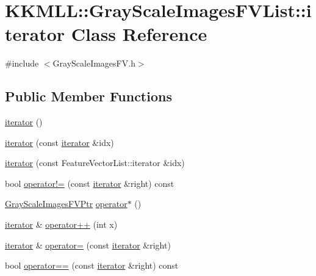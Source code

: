 \hypertarget{class_k_k_m_l_l_1_1_gray_scale_images_f_v_list_1_1iterator}{}\section{K\+K\+M\+LL\+:\+:Gray\+Scale\+Images\+F\+V\+List\+:\+:iterator Class Reference}
\label{class_k_k_m_l_l_1_1_gray_scale_images_f_v_list_1_1iterator}


{\ttfamily \#include $<$Gray\+Scale\+Images\+F\+V.\+h$>$}

\subsection*{Public Member Functions}
\begin{DoxyCompactItemize}
\item 
\hyperlink{class_k_k_m_l_l_1_1_gray_scale_images_f_v_list_1_1iterator_a393c2e6897e1a9809ebfdb9109e57688}{iterator} ()
\item 
\hyperlink{class_k_k_m_l_l_1_1_gray_scale_images_f_v_list_1_1iterator_a1af9cb801447f77b7c36b4d9a1e832b8}{iterator} (const \hyperlink{class_k_k_m_l_l_1_1_gray_scale_images_f_v_list_1_1iterator}{iterator} \&idx)
\item 
\hyperlink{class_k_k_m_l_l_1_1_gray_scale_images_f_v_list_1_1iterator_a5d5ac8c1aae68740d497374bb7aa72de}{iterator} (const Feature\+Vector\+List\+::iterator \&idx)
\item 
bool \hyperlink{class_k_k_m_l_l_1_1_gray_scale_images_f_v_list_1_1iterator_ae37a85e3d12769291e3729334c2548a7}{operator!=} (const \hyperlink{class_k_k_m_l_l_1_1_gray_scale_images_f_v_list_1_1iterator}{iterator} \&right) const 
\item 
\hyperlink{namespace_k_k_m_l_l_ac3f21d259a7b1893920f27296d70bc6e}{Gray\+Scale\+Images\+F\+V\+Ptr} \hyperlink{class_k_k_m_l_l_1_1_gray_scale_images_f_v_list_1_1iterator_af27476d091ea5de61fd47b3c65123f75}{operator$\ast$} ()
\item 
\hyperlink{class_k_k_m_l_l_1_1_gray_scale_images_f_v_list_1_1iterator}{iterator} \& \hyperlink{class_k_k_m_l_l_1_1_gray_scale_images_f_v_list_1_1iterator_af110b91548f283b9a7d8695884cb130e}{operator++} (int x)
\item 
\hyperlink{class_k_k_m_l_l_1_1_gray_scale_images_f_v_list_1_1iterator}{iterator} \& \hyperlink{class_k_k_m_l_l_1_1_gray_scale_images_f_v_list_1_1iterator_ab4aa3928c8c34200349b0e12857f7bb7}{operator=} (const \hyperlink{class_k_k_m_l_l_1_1_gray_scale_images_f_v_list_1_1iterator}{iterator} \&right)
\item 
bool \hyperlink{class_k_k_m_l_l_1_1_gray_scale_images_f_v_list_1_1iterator_ac926dffee0f09d7500d40347099b671b}{operator==} (const \hyperlink{class_k_k_m_l_l_1_1_gray_scale_images_f_v_list_1_1iterator}{iterator} \&right) const 
\end{DoxyCompactItemize}


